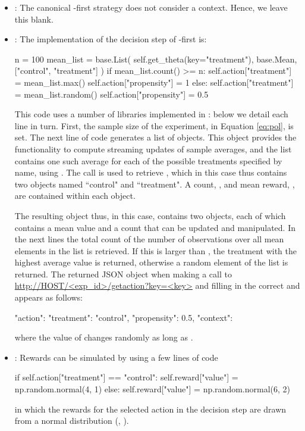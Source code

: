 \documentclass[nojss]{jss}
\begin{document}
\begin{itemize}

\item {}: The canonical -first strategy does not consider a context. Hence, we leave this blank.
\item {}: The implementation of the decision step of -first is:
\begin{Code}
n = 100
mean_list = base.List(
             self.get_theta(key="treatment"), 
             base.Mean, ["control", "treatment"]
             )
if mean_list.count() >= n:
    self.action["treatment"] = mean_list.max()
    self.action["propensity"] = 1
else:
    self.action["treatment"] = mean_list.random()
    self.action["propensity"] = 0.5
\end{Code}
This code uses a number of libraries implemented in : below we detail each line in turn. First, the sample size of the experiment,  in Equation \ref{eq:pol}, is set. The next line of code generates a list of  objects. This object provides the functionality to compute streaming updates of sample averages, and the list contains one such average for each of the possible treatments specified by name, using . The  call is used to retrieve , which in this case thus contains two  objects named ``control" and ``treatment". A count, , and mean reward, , are contained within each   object.

The resulting  object thus, in this case, contains two  objects, each of which contains a mean value and a count that can be updated and manipulated. In the next lines the total count of the number of observations over all mean elements in the list is retrieved. If this is larger than , the treatment with the highest average value is returned, otherwise a random element of the list is returned. The returned JSON object when making a call to \url{http://HOST/<exp_id>/getaction?key=<key>} and filling in the correct  and  appears as follows:
\begin{Code}
{"action": 
     {"treatment": "control", 
     "propensity": 0.5},
"context": {}}
\end{Code}
where the value of  changes randomly as long as .


\item {}: Rewards can be simulated by using a few lines of  code
\begin{Code}
if self.action["treatment"] == "control":
    self.reward["value"] = np.random.normal(4, 1)
else:
    self.reward["value"] = np.random.normal(6, 2)
\end{Code}
in which the rewards for the selected action in the decision step are drawn from a normal distribution (, ).


\end{itemize}
\end{document}
